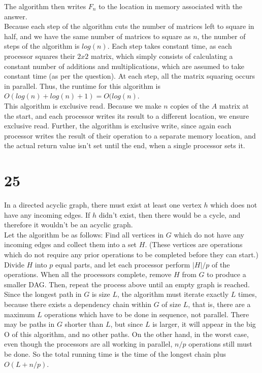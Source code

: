 \documentclass[letterpaper,notitlepage,twoside]{article}
\begin{document}
The algorithm then writes $F_n$ to the location in memory associated with the answer. \\
Because each step of the algorithm cuts the number of matrices left to square in half, and we have the same number of matrices to square as $n$, the number of steps of the algorithm is $log(n)$. Each step takes constant time, as each processor squares their $2x2$ matrix, which simply consists of calculating a constant number of additions and multiplications, which are assumed to take constant time (as per the question). At each step, all the matrix squaring occurs in parallel. Thus, the runtime for this algorithm is $O(log(n) + log(n) + 1) = O(log(n)$. \\
This algorithm is exclusive read. Because we make $n$ copies of the $A$ matrix at the start, and each processor writes its result to a different location, we ensure exclusive read. Further, the algorithm is exclusive write, since again each processor writes the result of their operation to a separate memory location, and the actual return value isn't set until the end, when a single processor sets it. 
\section*{25}
In a directed acyclic graph, there must exist at least one vertex $h$ which does not have any incoming edges. If $h$ didn't exist, then there would be a cycle, and therefore it wouldn't be an acyclic graph. 
\\
Let the algorithm be as follows:
Find all vertices in $G$ which do not have any incoming edges and collect them into a set $H$. (These vertices are operations which do not require any prior operations to be completed before they can start.) Divide $H$ into $p$ equal parts, and let each processor perform $|H|/p$ of the operations. When all the processors complete, remove $H$ from $G$ to produce a smaller DAG. Then, repeat the process above until an empty graph is reached.
\\
Since the longest path in $G$ is size $L$, the algorithm must iterate exactly $L$ times, because there exists a dependency chain within $G$ of size $L$, that is, there are a maximum $L$ operations which have to be done in sequence, not parallel. There may be paths in $G$ shorter than $L$, but since $L$ is larger, it will appear in the big O of this algorithm, and no other paths. On the other hand, in the worst case, even though the processors are all working in parallel, $n/p$ operations still must be done. So the total running time is the time of the longest chain plus $O(L + n/p)$.
\end{document}
